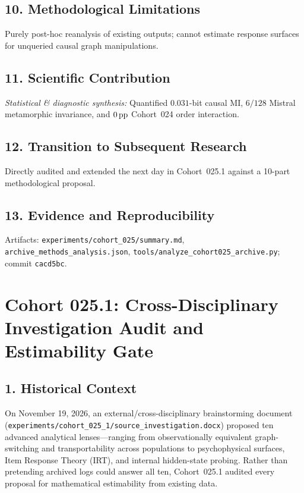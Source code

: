 \subsection*{10. Methodological Limitations}
Purely post-hoc reanalysis of existing outputs; cannot estimate response surfaces for unqueried causal graph manipulations.

\subsection*{11. Scientific Contribution}
\emph{Statistical \& diagnostic synthesis:} Quantified $0.031$-bit causal MI, $6/128$ Mistral metamorphic invariance, and $0\,\mathrm{pp}$ Cohort~024 order interaction.

\subsection*{12. Transition to Subsequent Research}
Directly audited and extended the next day in Cohort~025.1 against a 10-part methodological proposal.

\subsection*{13. Evidence and Reproducibility}
Artifacts: \texttt{experiments/cohort\_025/summary.md}, \texttt{archive\_methods\_analysis.json}, \texttt{tools/analyze\_cohort025\_archive.py}; commit \texttt{cacd5bc}.

\section{Cohort 025.1: Cross-Disciplinary Investigation Audit and Estimability Gate}

\subsection*{1. Historical Context}
On November 19, 2026, an external/cross-disciplinary brainstorming document (\texttt{experiments/cohort\_025\_1/source\_investigation.docx}) proposed ten advanced analytical lenses---ranging from observationally equivalent graph-switching and transportability across populations to psychophysical surfaces, Item Response Theory (IRT), and internal hidden-state probing. Rather than pretending archived logs could answer all ten, Cohort~025.1 audited every proposal for mathematical estimability from existing data.

